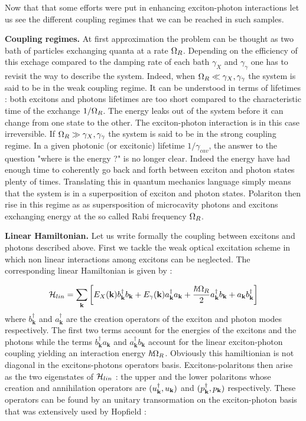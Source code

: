 \noindent Now that that some efforts were put in enhancing exciton-photon interactions let us see the different coupling regimes that we can be reached in such samples. 



\bigskip
\noindent \textbf{Coupling regimes.} At first approximation the problem can be thought as two bath of particles 
exchanging quanta at a rate $\Omega_R$. Depending on the efficiency of this exchage compared to
the damping rate of each bath $\gamma_X$ and $\gamma_{\gamma}$ one has to revisit the way to describe the system. Indeed, when 
$\Omega_R \ll \gamma_X, \gamma_{\gamma}$ the system is said to be in the weak coupling regime. It can be understood in terms of lifetimes : both excitons and photons lifetimes are too short compared to the 
characteristic time of the exchange $1/\Omega_R$. The energy leaks out of the system before it can change from one state to the other. The exciton-photon interaction is in this case irreversible.
If $\Omega_R \gg \gamma_X, \gamma_{\gamma}$ the system is said to be in the strong coupling regime. In a given photonic (or excitonic) lifetime $1/\gamma_{cav}$,
the answer to the question "where is the energy ?" is no longer clear. Indeed the energy have had enough time to coherently go back and forth between exciton and photon states plenty of times. Translating
this in quantum mechanics language simply means that the system is in a superposition of exciton and photon states. Polariton then rise in this regime as
as supersposition of microcavity photons and excitons exchanging energy at the so called Rabi frequency $\Omega_R$. 

\bigskip

\textbf{Linear Hamiltonian.} Let us write formally the coupling between excitons and photons described above. First we tackle
the weak optical excitation scheme in which non linear interactions among excitons can be neglected. The corresponding linear Hamiltonian 
is given by : 

\begin{equation}
    \mathcal{H}_{lin} = \sum_{\mathbf{k}}\left[E_X(\mathbf{k})b^{\dagger}_{\mathbf{k}}b_{\mathbf{k}} + E_{\gamma}(\mathbf{k})a^{\dagger}_{\mathbf{k}}a_{\mathbf{k}} + \dfrac{\hbar\Omega_R}{2}a^{\dagger}_{\mathbf{k}}b_{\mathbf{k}} + a_{\mathbf{k}}b^{\dagger}_{\mathbf{k}}\right]
    \label{eq:linear_hamiltonian}
\end{equation}
where $b^{\dagger}_{\mathbf{k}}$ and $a^{\dagger}_{\mathbf{k}}$ are the creation operators of the exciton and photon modes respectively. The first two terms account for the energies of the excitons and the photons while 
the terms $b^{\dagger}_{\mathbf{k}}a_{\mathbf{k}}$ and $a^{\dagger}_{\mathbf{k}}b_{\mathbf{k}}$ account for the linear exciton-photon coupling yielding an interaction energy $\hbar\Omega_R$. 
Obviously this hamiltionian is not diagonal in the excitons-photons operators basis.
Excitons-polaritons then arise as the two eigenstates of $\mathcal{H}_{lin}$ : the upper and the lower polaritons whose creation and annihilation operators are  $(u_{\mathbf{k}}^{\dagger}, u_{\mathbf{k}})$ and $(p_{\mathbf{k}}^{\dagger}, p_{\mathbf{k}})$ respectively.
These operators can be found by an unitary transormation on the exciton-photon basis that was extensively used by Hopfield \cite{hopfield_theory_1958}  :


